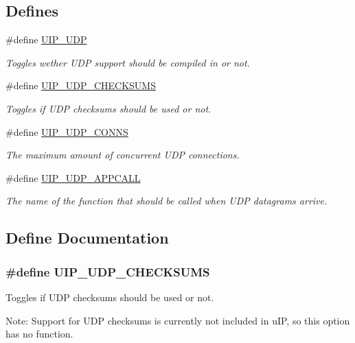 \subsection*{Defines}
\begin{CompactItemize}
\item 
\hypertarget{a00073_gdcf372ff9748996f7c05e9822a615384}{
\#define \hyperlink{a00073_gdcf372ff9748996f7c05e9822a615384}{UIP\_\-UDP}}
\label{a00073_gdcf372ff9748996f7c05e9822a615384}

\begin{CompactList}\small\item\em Toggles wether UDP support should be compiled in or not. \item\end{CompactList}\item 
\#define \hyperlink{a00073_g92f3344ec8ca46893163399c89fafed5}{UIP\_\-UDP\_\-CHECKSUMS}
\begin{CompactList}\small\item\em Toggles if UDP checksums should be used or not. \item\end{CompactList}\item 
\hypertarget{a00073_g196379ceb1219a99f4495e41ccc9bbfb}{
\#define \hyperlink{a00073_g196379ceb1219a99f4495e41ccc9bbfb}{UIP\_\-UDP\_\-CONNS}}
\label{a00073_g196379ceb1219a99f4495e41ccc9bbfb}

\begin{CompactList}\small\item\em The maximum amount of concurrent UDP connections. \item\end{CompactList}\item 
\hypertarget{a00073_g3d768e989e308144190ae1a5ddfa9726}{
\#define \hyperlink{a00073_g3d768e989e308144190ae1a5ddfa9726}{UIP\_\-UDP\_\-APPCALL}}
\label{a00073_g3d768e989e308144190ae1a5ddfa9726}

\begin{CompactList}\small\item\em The name of the function that should be called when UDP datagrams arrive. \item\end{CompactList}\end{CompactItemize}


\subsection{Define Documentation}
\hypertarget{a00073_g92f3344ec8ca46893163399c89fafed5}{
\subsubsection[UIP\_\-UDP\_\-CHECKSUMS]{\setlength{\rightskip}{0pt plus 5cm}\#define UIP\_\-UDP\_\-CHECKSUMS}}
\label{a00073_g92f3344ec8ca46893163399c89fafed5}


Toggles if UDP checksums should be used or not. 

\begin{Desc}
\item[Note:]Support for UDP checksums is currently not included in u\-IP, so this option has no function. \end{Desc}
